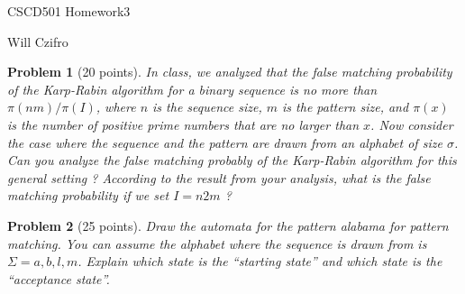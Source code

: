 \documentclass[11pt]{article}
\newtheorem{problem}{Problem}
\begin{document}
\begin{center}
  {\LARGE CSCD501 Homework3}

\bigskip 

{\Large Will Czifro}

\end{center}

\bigskip 

\begin{problem}[20 points]
\label{prob:1}
 In class, we analyzed that the false matching probability of the Karp-Rabin algorithm for
a binary sequence is no more than $\pi(nm)/\pi(I)$, where $n$ is the sequence size, $m$ is the pattern size, and $\pi(x)$ is
the number of positive prime numbers that are no larger than $x$. Now consider the case where the sequence and
the pattern are drawn from an alphabet of size $\sigma$. Can you analyze the false matching probably of the Karp-Rabin
algorithm for this general setting ? According to the result from your analysis, what is the false matching probability
if we set $I = n2m$ ?
\end{problem}




\begin{problem}[25 points]
\label{prob:2}
 Draw the automata for the pattern alabama for pattern matching. You can assume the
alphabet where the sequence is drawn from is $\Sigma = {a, b, l, m}$. Explain which state is the “starting state” and which
state is the “acceptance state”.
\end{problem}



\end{document}
